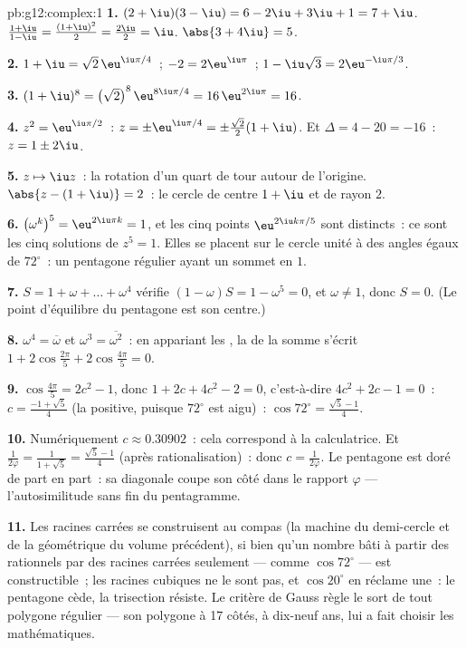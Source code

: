\begin{solution}{pb:g12:complex:1}
\textbf{1.} $(2 + \iu)(3 - \iu) = 6 - 2\iu + 3\iu + 1 = 7 + \iu$.
\quad $\frac{1 + \iu}{1 - \iu} = \frac{(1 + \iu)^2}{2} =
\frac{2\iu}{2} = \iu$. \quad $\abs{3 + 4\iu} = 5$.

\textbf{2.} $1 + \iu = \sqrt2\,\eu^{\iu\pi/4}$~;
$-2 = 2\eu^{\iu\pi}$~; $1 - \iu\sqrt3 = 2\eu^{-\iu\pi/3}$.

\textbf{3.} $(1 + \iu)^8 = \left(\sqrt2\right)^8
\eu^{8\iu\pi/4} = 16\,\eu^{2\iu\pi} = 16$.

\textbf{4.} $z^2 = \eu^{\iu\pi/2}$~:
$z = \pm\eu^{\iu\pi/4} = \pm\frac{\sqrt2}{2}(1 + \iu)$. Et
$\Delta = 4 - 20 = -16$~: $z = 1 \pm 2\iu$.

\textbf{5.} $z \mapsto \iu z$~: la rotation d'un quart de tour
autour de l'origine. $\abs{z - (1 + \iu)} = 2$~: le cercle de
centre $1 + \iu$ et de rayon $2$.

\textbf{6.} $\left(\omega^k\right)^5 = \eu^{2\iu\pi k} = 1$, et les
cinq points $\eu^{2\iu k\pi/5}$ sont distincts~: ce sont les cinq
solutions de $z^5 = 1$. Elles se placent sur le cercle unité à des
angles égaux de $72^\circ$~: un pentagone régulier ayant un sommet
en $1$.

\textbf{7.} $S = 1 + \omega + \dots + \omega^4$ vérifie
$(1 - \omega)S = 1 - \omega^5 = 0$, et $\omega \neq 1$, donc
$S = 0$. (Le point d'équilibre du pentagone est son centre.)

\textbf{8.} $\omega^4 = \overline\omega$ et
$\omega^3 = \overline{\omega^2}$~: en appariant les , la
 de la somme s'écrit
$1 + 2\cos\frac{2\pi}{5} + 2\cos\frac{4\pi}{5} = 0$.

\textbf{9.} $\cos\frac{4\pi}{5} = 2c^2 - 1$, donc
$1 + 2c + 4c^2 - 2 = 0$, c'est-à-dire $4c^2 + 2c - 1 = 0$~:
$c = \frac{-1 + \sqrt5}{4}$ (la  positive, puisque
$72^\circ$ est aigu)~: $\cos 72^\circ = \frac{\sqrt5 - 1}{4}$.

\textbf{10.} Numériquement $c \approx 0.30902$~: cela correspond à
la calculatrice. Et $\frac{1}{2\varphi} = \frac{1}{1 + \sqrt5} =
\frac{\sqrt5 - 1}{4}$ (après rationalisation)~: donc
$c = \frac{1}{2\varphi}$. Le pentagone est doré de part en part~:
sa diagonale coupe son côté dans le rapport $\varphi$ ---
l'autosimilitude sans fin du pentagramme.

\textbf{11.} Les racines carrées se construisent au compas (la
machine du demi-cercle et de la  géométrique du volume
précédent), si bien qu'un nombre bâti à partir des rationnels par
des racines carrées seulement --- comme $\cos 72^\circ$ --- est
constructible~; les racines cubiques ne le sont pas, et
$\cos 20^\circ$ en réclame une~: le pentagone cède, la trisection
résiste. Le critère de Gauss règle le sort de tout polygone
régulier --- son polygone à 17 côtés, à dix-neuf ans, lui a fait
choisir les mathématiques.


\end{solution}
